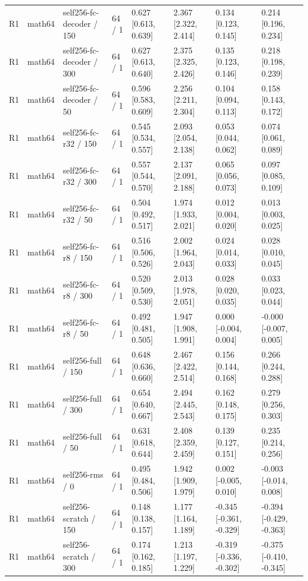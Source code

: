 \begin{tabular}{llllllll}
R1 & math64 & self256-fc-decoder / 150 & 64 / 1 & 0.627 [0.613, 0.639] & 2.367 [2.322, 2.414] & 0.134 [0.123, 0.145] & 0.214 [0.196, 0.234] \\
R1 & math64 & self256-fc-decoder / 300 & 64 / 1 & 0.627 [0.613, 0.640] & 2.375 [2.325, 2.426] & 0.135 [0.123, 0.146] & 0.218 [0.198, 0.239] \\
R1 & math64 & self256-fc-decoder / 50 & 64 / 1 & 0.596 [0.583, 0.609] & 2.256 [2.211, 2.304] & 0.104 [0.094, 0.113] & 0.158 [0.143, 0.172] \\
R1 & math64 & self256-fc-r32 / 150 & 64 / 1 & 0.545 [0.534, 0.557] & 2.093 [2.054, 2.138] & 0.053 [0.044, 0.062] & 0.074 [0.061, 0.089] \\
R1 & math64 & self256-fc-r32 / 300 & 64 / 1 & 0.557 [0.544, 0.570] & 2.137 [2.091, 2.188] & 0.065 [0.056, 0.073] & 0.097 [0.085, 0.109] \\
R1 & math64 & self256-fc-r32 / 50 & 64 / 1 & 0.504 [0.492, 0.517] & 1.974 [1.933, 2.021] & 0.012 [0.004, 0.020] & 0.013 [0.003, 0.025] \\
R1 & math64 & self256-fc-r8 / 150 & 64 / 1 & 0.516 [0.506, 0.526] & 2.002 [1.964, 2.043] & 0.024 [0.014, 0.033] & 0.028 [0.010, 0.045] \\
R1 & math64 & self256-fc-r8 / 300 & 64 / 1 & 0.520 [0.509, 0.530] & 2.013 [1.978, 2.051] & 0.028 [0.020, 0.035] & 0.033 [0.023, 0.044] \\
R1 & math64 & self256-fc-r8 / 50 & 64 / 1 & 0.492 [0.481, 0.505] & 1.947 [1.908, 1.991] & 0.000 [-0.004, 0.004] & -0.000 [-0.007, 0.005] \\
R1 & math64 & self256-full / 150 & 64 / 1 & 0.648 [0.636, 0.660] & 2.467 [2.422, 2.514] & 0.156 [0.144, 0.168] & 0.266 [0.244, 0.288] \\
R1 & math64 & self256-full / 300 & 64 / 1 & 0.654 [0.640, 0.667] & 2.494 [2.445, 2.543] & 0.162 [0.148, 0.175] & 0.279 [0.256, 0.303] \\
R1 & math64 & self256-full / 50 & 64 / 1 & 0.631 [0.618, 0.644] & 2.408 [2.359, 2.459] & 0.139 [0.127, 0.151] & 0.235 [0.214, 0.256] \\
R1 & math64 & self256-rms / 0 & 64 / 1 & 0.495 [0.484, 0.506] & 1.942 [1.909, 1.979] & 0.002 [-0.005, 0.010] & -0.003 [-0.014, 0.008] \\
R1 & math64 & self256-scratch / 150 & 64 / 1 & 0.148 [0.138, 0.157] & 1.177 [1.164, 1.189] & -0.345 [-0.361, -0.329] & -0.394 [-0.429, -0.363] \\
R1 & math64 & self256-scratch / 300 & 64 / 1 & 0.174 [0.162, 0.185] & 1.213 [1.197, 1.229] & -0.319 [-0.336, -0.302] & -0.375 [-0.410, -0.345] \\

\end{tabular}
